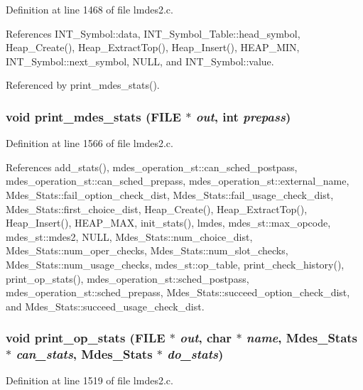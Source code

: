 Definition at line 1468 of file lmdes2.c.

References INT\_\-Symbol::data, INT\_\-Symbol\_\-Table::head\_\-symbol, Heap\_\-Create(), Heap\_\-Extract\-Top(), Heap\_\-Insert(), HEAP\_\-MIN, INT\_\-Symbol::next\_\-symbol, NULL, and INT\_\-Symbol::value.

Referenced by print\_\-mdes\_\-stats().
\subsubsection{\setlength{\rightskip}{0pt plus 5cm}void print\_\-mdes\_\-stats (FILE $\ast$ {\em out}, int {\em prepass})}\label{lmdes2_8c_8df6c58c53e5c8878fdacd3b6bd89819}




Definition at line 1566 of file lmdes2.c.

References add\_\-stats(), mdes\_\-operation\_\-st::can\_\-sched\_\-postpass, mdes\_\-operation\_\-st::can\_\-sched\_\-prepass, mdes\_\-operation\_\-st::external\_\-name, Mdes\_\-Stats::fail\_\-option\_\-check\_\-dist, Mdes\_\-Stats::fail\_\-usage\_\-check\_\-dist, Mdes\_\-Stats::first\_\-choice\_\-dist, Heap\_\-Create(), Heap\_\-Extract\-Top(), Heap\_\-Insert(), HEAP\_\-MAX, init\_\-stats(), lmdes, mdes\_\-st::max\_\-opcode, mdes\_\-st::mdes2, NULL, Mdes\_\-Stats::num\_\-choice\_\-dist, Mdes\_\-Stats::num\_\-oper\_\-checks, Mdes\_\-Stats::num\_\-slot\_\-checks, Mdes\_\-Stats::num\_\-usage\_\-checks, mdes\_\-st::op\_\-table, print\_\-check\_\-history(), print\_\-op\_\-stats(), mdes\_\-operation\_\-st::sched\_\-postpass, mdes\_\-operation\_\-st::sched\_\-prepass, Mdes\_\-Stats::succeed\_\-option\_\-check\_\-dist, and Mdes\_\-Stats::succeed\_\-usage\_\-check\_\-dist.
\subsubsection{\setlength{\rightskip}{0pt plus 5cm}void print\_\-op\_\-stats (FILE $\ast$ {\em out}, char $\ast$ {\em name}, \bf{Mdes\_\-Stats} $\ast$ {\em can\_\-stats}, \bf{Mdes\_\-Stats} $\ast$ {\em do\_\-stats})}\label{lmdes2_8c_87e34ca62bc70490fa7d9c29f6f85044}




Definition at line 1519 of file lmdes2.c.

